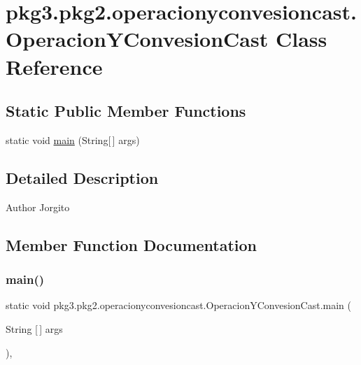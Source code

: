 \hypertarget{classpkg3_1_1pkg2_1_1operacionyconvesioncast_1_1_operacion_y_convesion_cast}{}\section{pkg3.\+pkg2.\+operacionyconvesioncast.\+Operacion\+Y\+Convesion\+Cast Class Reference}
\label{classpkg3_1_1pkg2_1_1operacionyconvesioncast_1_1_operacion_y_convesion_cast}
\subsection*{Static Public Member Functions}
\begin{DoxyCompactItemize}
\item 
static void \mbox{\hyperlink{classpkg3_1_1pkg2_1_1operacionyconvesioncast_1_1_operacion_y_convesion_cast_a04e61f8cc4017dbcbae90b7ed4c70c74}{main}} (String\mbox{[}$\,$\mbox{]} args)
\end{DoxyCompactItemize}


\subsection{Detailed Description}
\begin{DoxyAuthor}{Author}
Jorgito 
\end{DoxyAuthor}


\subsection{Member Function Documentation}
\mbox{\label{classpkg3_1_1pkg2_1_1operacionyconvesioncast_1_1_operacion_y_convesion_cast_a04e61f8cc4017dbcbae90b7ed4c70c74}} 
\subsubsection{\texorpdfstring{main()}{main()}}
{\footnotesize\ttfamily static void pkg3.\+pkg2.\+operacionyconvesioncast.\+Operacion\+Y\+Convesion\+Cast.\+main (\begin{DoxyParamCaption}\item[{String \mbox{[}$\,$\mbox{]}}]{args }\end{DoxyParamCaption})\hspace{0.3cm}{\ttfamily [inline]}, {\ttfamily [static]}}


